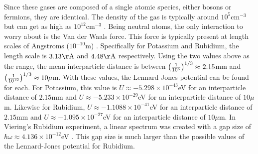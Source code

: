 Since these gases are composed of a single atomic species, either bosons or fermions, they are identical. 
The density of the gas is typically around $10^5 \text{cm}^{-3}$ \cite{Viering} but can get as high as $10^{12} \text{cm}^{-3}$ \cite{Radwell}. 
Being neutral atoms, the only interaction to worry about is the Van der Waals force. 
This force is typically present at length scales of Angstroms ($10^{-10}$m) \cite{biochem}. 
Specifically for Potassium and Rubidium, the length scale is $3.13\rm \AA$ \cite{Pot} and $4.48\rm \AA$ \cite{Rub} respectively. 
Using the two values above as the range, the mean interparticle distance is between $\qty(\frac{1}{10^5})^{1/3}\approx 2.15$mm and $\qty(\frac{1}{10^{12}})^{1/3}\approx 10 \mu$m. With these values, the Lennard-Jones potential can be found for each. For Potassium, this value is $U\approx-5.298\times 10^{-43}$eV for an interparticle distance of $2.15$mm and $U\approx-5.233\times 10^{-29}$eV for an interparticle distance of $10 \mu$m. Likewise for Rubidium, $U\approx-1.1088\times 10^{-41}$eV for an interparticle distance of $2.15$mm and $U\approx-1.095\times 10^{-27}$eV for an interparticle distance of $10 \mu$m. In Viering's Rubidium experiment, a linear spectrum was created with a gap size of $\hbar\omega\approx 4.136\times 10^{-12}$eV \cite{Viering}. This gap size is much larger than the possible values of the Lennard-Jones potential for Rubidium. 

